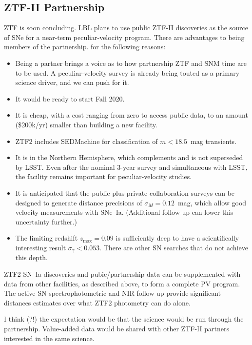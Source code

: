 \subsection{ZTF-II Partnership}

ZTF is soon concluding.  LBL plans to use public ZTF-II discoveries as the source of SNe for a near-term peculiar-velocity program.
There are advantages to being members of the partnership.
for the following reasons:
\begin{itemize}
\item Being a partner brings a voice as to how partnership ZTF and SNM time are to be used.  
A peculiar-velocity survey is already being touted as a primary science driver, and we can push for it.
\item It would be ready to start Fall 2020.
\item It is cheap, with a cost ranging from zero to access public data, to an amount (\$200k/yr) smaller
than building a new facility.
\item ZTF2 includes SEDMachine for classification of $m<18.5$~mag  transients.
\item It is in the Northern Hemisphere, which complements and is not superseded by LSST. 
Even after the nominal 3-year survey and simultaneous with LSST, the facility remains important for peculiar-velocity studies.
\item It is anticipated that the public plus private collaboration surveys can be designed to generate distance
precisions of $\sigma_M =0.12$~mag, which allow good velocity measurements with SNe~Ia.  (Additional follow-up can lower this uncertainty further.)
\item The limiting redshift $z_{\text{max}} =0.09$ is sufficiently deep  to have a scientifically interesting result $\sigma_\gamma < 0.053$.
There are other SN searches that do not achieve this depth.
\end{itemize}

ZTF2 SN~Ia discoveries and pubic/partnership data can be supplemented  with data from other facilities, as described above, to form a complete PV program.  
The active SN spectrophotometric and NIR follow-up provide significant distances estimates over
what ZTF2 photometry can do alone.

I think (?!) the expectation would be that the science would be run through the partnership.  Value-added data would be shared with other ZTF-II
partners interested in the same science.


